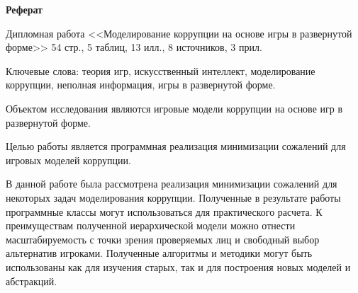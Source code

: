 \begin{center}
	{\large \textbf{Реферат}}
\end{center}
\par
Дипломная работа <<Моделирование коррупции на основе игры в развернутой форме>> 54 стр., 5 таблиц, 13 илл., 8 источников, 3 прил.
\par
Ключевые слова: теория игр, искусственный интеллект, моделирование коррупции, неполная информация, игры в развернутой форме.
\par
Объектом исследования являются игровые модели коррупции на основе игр в развернутой форме.
\par
Целью работы является программная реализация минимизации сожалений для игровых моделей коррупции.
\par
В данной работе была рассмотрена реализация минимизации сожалений для некоторых задач моделирования коррупции.
Полученные в результате работы программные классы могут использоваться для практического расчета. К преимуществам полученной иерархической модели можно отнести масштабируемость с точки зрения проверяемых лиц и свободный выбор альтернатив игроками. Полученные алгоритмы и методики могут быть использованы как для изучения старых, так и для построения новых моделей и абстракций.